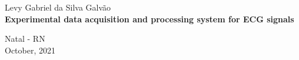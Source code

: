 \onehalfspacing
\begin{titlepage}
	\begin{center}
	
	\begin{figure}[!ht]
	\centering
	\end{figure}

		\vspace{15pt}
        \vspace{50pt}
        \large{Levy Gabriel da Silva Galvão}\\
		\vspace{3,5cm}
		\textbf{\Large{Experimental data acquisition and processing system for ECG signals}}
	\end{center}
	

	\vspace{1cm}
	
	\begin{center}
		\vspace{\fill}
		Natal - RN \\ October, 2021
	\end{center}
\end{titlepage}

\newpage